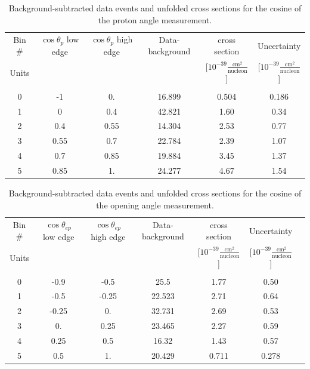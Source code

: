\documentclass[amsmath,amssymb,aps,prd,showpacs,twocolumn,superscriptaddress,letterpaper,longbibliography, floatfix]{revtex4-2}
\begin{document}
\begin{table}[H]
\caption{Background-subtracted data events and unfolded cross sections for the cosine of the proton angle measurement.}
\label{tbl:ResPA}
\begin{center} 
\begin{tabular}{|c|c|c|c|c|c|}
\hline
Bin \# & $\cos\theta_p$ low edge & $\cos\theta_p$ high edge  & Data-background&  cross section  & Uncertainty   \\
Units& &&&[$10^{-39}\frac{\mathrm{cm^2}}{\mathrm{nucleon}}$]&[$10^{-39}\frac{\mathrm{cm^2}}{\mathrm{nucleon}}$]\\
&&&&&\\
0&-1&0.& 16.899&0.504&0.186\\
1&0&0.4&42.821&1.60&0.34\\
2&0.4&0.55&14.304&2.53&0.77\\
3&0.55&0.7&22.784&2.39&1.07\\
4&0.7&0.85&19.884&3.45&1.37\\
5&0.85&1.&24.277&4.67&1.54\\
\hline
\end{tabular} \end{center}
\end{table}\FloatBarrier
\begin{table}[H]
\caption{Background-subtracted data events and unfolded cross sections for the cosine of the opening angle measurement.}
\label{tbl:ResOpAng}
\begin{center} \begin{tabular}{|c|c|c|c|c|c|c|}
\hline

Bin \# & $\cos\theta_{ep}$ low edge & $\cos\theta_{ep}$ high edge  & Data-background&  cross section & Uncertainty  \\
Units& &&&[$10^{-39}\frac{\mathrm{cm^2}}{\mathrm{nucleon}}$]&[$10^{-39}\frac{\mathrm{cm^2}}{\mathrm{nucleon}}$]\\
&&&&&\\
0&-0.9&-0.5& 25.5&1.77&0.50\\
1&-0.5&-0.25&22.523&2.71&0.64\\
2&-0.25&0.&32.731&2.69&0.53\\
3&0.&0.25&23.465&2.27&0.59\\
4&0.25&0.5&16.32&1.43&0.57\\
5&0.5&1.&20.429&0.711&0.278\\
\hline
\end{tabular} \end{center}
\end{table}\FloatBarrier
\end{document}
